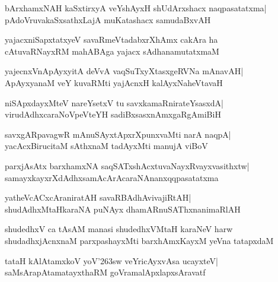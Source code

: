 \documentclass[twoside,12pt,openright]{book}
\def\S{\char'263}
\newcounter{shloka}[chapter]
\begin{document}
\begin{shloka}%
bArxhamxNAH kaSxtirxyA veYshAyxH shUdArxshacx naqpasatatxma|\\
pAdoVruvakaSxsathxLajA muKatashacx samudaBxvAH
\end{shloka}

\begin{shloka}%
yajacxniSapxtatxyeV savaRmeVtadabxrXhAmx cakAra ha\\
cAtuvaRNayxRM mahABAga yajacx sAdhanamutatxmaM
\end{shloka}

\begin{shloka}%
yajecnxVnApAyxyitA deVvA vaqSuTxyXtasxgeRVNa mAnavAH|\\
ApAyxyanaM veY kuvaRMti yajAcnxH kalAyxNaheVtavaH
\end{shloka}

\begin{shloka}%
niSApxdayxMteV nareYsetxV tu savxkamaRnirateYsasxdA|\\
virudAdhxcaraNoVpeVteYH sadiBxsasxnAmxgaRgAmiBiH
\end{shloka}

\begin{shloka}%
savxgARpavagwR mAnuSAyxtApxrXpunxvaMti narA naqpA|\\
yacAcxBirucitaM sAthxnaM tadAyxMti manujA viBoV
\end{shloka}

\begin{shloka}%
parxjAsAtx barxhamxNA saqSATxshAcxtuvaNayxRvayxvasithxtw|\\
samayxkayxrXdAdhxsamAcArAcaraNAnanxqqpasatatxma
\end{shloka}

\begin{shloka}%
yatheVcACxcAraniratAH savaRBAdhAvivajiRtAH|\\
shudAdhxMtaHkaraNA puNAyx dhamARnuSAThxnanimaRlAH
\end{shloka}

\begin{shloka}%
shudedhxV ca tAsAM manasi shudedhxVMtaH karaNeV harw\\
shudadhxjAcnxnaM parxpashayxMti barxhAmxKayxM yeVna tatapxdaM
\end{shloka}

\begin{shloka}%
tataH kAlAtamxkoV yoV\S sw veYricAyxvAsa ucayxteV|\\
saMsArapAtamatayxthaRM goVramalApxlapxsAravatf
\end{shloka}
\end{document}
